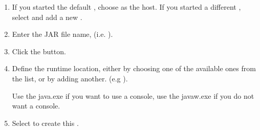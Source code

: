 \begin{enumerate}
\item If you started the default \gdserver, choose  as the \gdserver{} host. If you started a different \gdserver, select  and add a new \gdserver {}. 
\item Enter the JAR file name, 
(i.e. ). 
\item Click the  button.
\item Define the  runtime location, either by choosing one 
of the available ones from the list, or by adding another. 
(e.g 
). 

Use the java.exe if you want to use a console, use the javaw.exe if you do not want a console.
\item Select  to create this \gdproject{}. 
\end{enumerate}
